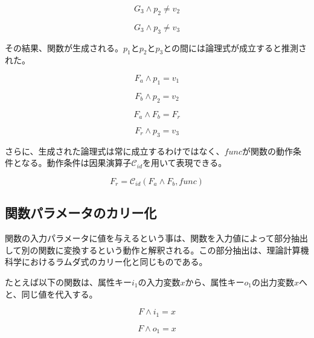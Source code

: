 \documentclass[12pt]{article}
\begin{document}
\begin{equation}   G_3 \wedge p_2 \neq v_2\end{equation}

\begin{equation}   G_3 \wedge p_3 \neq v_3\end{equation}

その結果、関数が生成される。\(p_1\)と\(p_2\)と\(p_3\)との間には論理式が成立すると推測された。

\begin{equation}   F_a \wedge p_1 = v_1\end{equation}

\begin{equation}   F_b \wedge p_2 = v_2\end{equation}

\begin{equation}   F_a \wedge F_b = F_r\end{equation}

\begin{equation}   F_r \wedge p_3 = v_3\end{equation}

さらに、生成された論理式は常に成立するわけではなく、\(func\)が関数の動作条件となる。動作条件は因果演算子\(\mathcal{C}_{id}\)を用いて表現できる。

\begin{equation}   F_r=\mathcal{C}_{id}(F_a \wedge F_b,func)\end{equation}

\subsection{関数パラメータのカリー化}\label{ux95a2ux6570ux30d1ux30e9ux30e1ux30fcux30bfux306eux30abux30eaux30fcux5316}

関数の入力パラメータに値を与えるという事は、関数を入力値によって部分抽出して別の関数に変換するという動作と解釈される。この部分抽出は、理論計算機科学におけるラムダ式のカリー化と同じものである。

たとえば以下の関数は、属性キー\(i_1\)の入力変数\(x\)から、属性キー\(o_1\)の出力変数\(x\)へと、同じ値を代入する。

\begin{equation}  F \wedge i_1 = x\end{equation}

\begin{equation}  F \wedge o_1 = x\end{equation}
\end{document}
